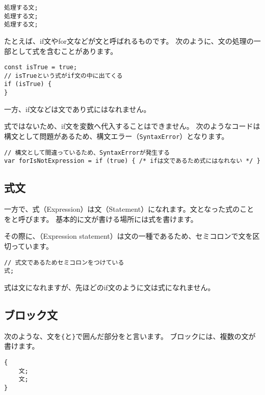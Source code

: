 \begin{lstlisting}
処理する文;
処理する文;
処理する文;
\end{lstlisting}

たとえば、if文やfor文などが文と呼ばれるものです。
次のように、文の処理の一部として式を含むことがあります。

\begin{lstlisting}
const isTrue = true;
// isTrueという式がif文の中に出てくる
if (isTrue) {
}
\end{lstlisting}

一方、if文などは文であり式にはなれません。

式ではないため、if文を変数へ代入することはできません。
次のようなコードは構文として問題があるため、構文エラー（\texttt{SyntaxError}）となります。

\begin{lstlisting}
// 構文として間違っているため、SyntaxErrorが発生する
var forIsNotExpression = if (true) { /* ifは文であるため式にはなれない */ }
\end{lstlisting}

\hypertarget{expression-statement}{%
\subsection{式文}\label{expression-statement}}

一方で、式（Expression）は文（Statement）になれます。文となった式のことを\textbf{}と呼びます。
基本的に文が書ける場所には式を書けます。

その際に、\textbf{}（Expression
statement）は文の一種であるため、セミコロンで文を区切っています。

\begin{lstlisting}
// 式文であるためセミコロンをつけている
式;
\end{lstlisting}

式は文になれますが、先ほどのif文のように文は式になれません。

\hypertarget{block-statement}{%
\subsection{ブロック文}\label{block-statement}}

次のような、文を\texttt{\{}と\texttt{\}}で囲んだ部分を\textbf{}と言います。
ブロックには、複数の文が書けます。
\newpage
\begin{lstlisting}
{
    文;
    文;
}
\end{lstlisting}

